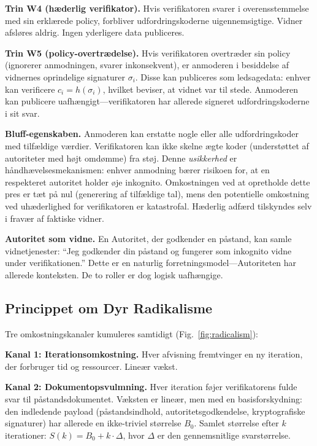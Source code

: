 \documentclass[11pt,a4paper,twocolumn]{article}
\begin{document}
\textbf{Trin W4 (hæderlig verifikator).} Hvis verifikatoren svarer i overensstemmelse med sin erklærede policy, forbliver udfordringskoderne uigennemsigtige. Vidner afsløres aldrig. Ingen yderligere data publiceres.

\textbf{Trin W5 (policy-overtrædelse).} Hvis verifikatoren overtræder sin policy (ignorerer anmodningen, svarer inkonsekvent), er anmoderen i besiddelse af vidnernes oprindelige signaturer $\sigma_i$. Disse kan publiceres som ledsagedata: enhver kan verificere $c_i = h(\sigma_i)$, hvilket beviser, at vidnet var til stede. Anmoderen kan publicere uafhængigt---verifikatoren har allerede signeret udfordringskoderne i sit svar.

\textbf{Bluff-egenskaben.} Anmoderen kan erstatte nogle eller alle udfordringskoder med tilfældige værdier. Verifikatoren kan ikke skelne ægte koder (understøttet af autoriteter med højt omdømme) fra støj. Denne \emph{usikkerhed} er håndhævelsesmekanismen: enhver anmodning bærer risikoen for, at en respekteret autoritet holder øje inkognito. Omkostningen ved at opretholde dette pres er tæt på nul (generering af tilfældige tal), mens den potentielle omkostning ved uhæderlighed for verifikatoren er katastrofal. Hæderlig adfærd tilskyndes selv i fravær af faktiske vidner.

\textbf{Autoritet som vidne.} En Autoritet, der godkender en påstand, kan samle vidnetjenester: ``Jeg godkender din påstand og fungerer som inkognito vidne under verifikationen.'' Dette er en naturlig forretningsmodel---Autoriteten har allerede konteksten. De to roller er dog logisk uafhængige.

\subsection{Princippet om Dyr Radikalisme}

Tre omkostningskanaler kumuleres samtidigt (Fig.~\ref{fig:radicalism}):

\textbf{Kanal 1: Iterationsomkostning.} Hver afvisning fremtvinger en ny iteration, der forbruger tid og ressourcer. Lineær vækst.

\textbf{Kanal 2: Dokumentopsvulmning.} Hver iteration føjer verifikatorens fulde svar til påstandsdokumentet. Væksten er lineær, men med en basisforskydning: den indledende payload (påstandsindhold, autoritetsgodkendelse, kryptografiske signaturer) har allerede en ikke-triviel størrelse $B_0$. Samlet størrelse efter $k$ iterationer: $S(k) = B_0 + k \cdot \Delta$, hvor $\Delta$ er den gennemsnitlige svarstørrelse.
\end{document}
